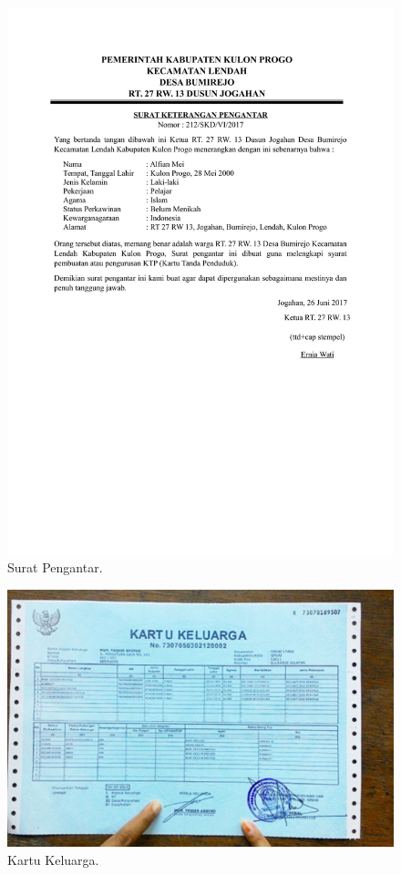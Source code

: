 \begin{figure}[H]
	\centering
	\includegraphics[width=16cm]{figures/pengantar.jpg}
	\caption{Surat Pengantar.}	
\end{figure}
\begin{figure}[H]
	\centering
	\includegraphics[width=16cm]{figures/kk.jpg}
	\caption{Kartu Keluarga.}	
\end{figure}
